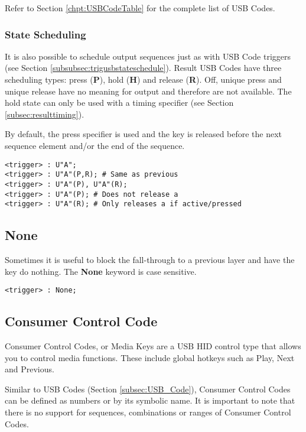 \documentclass{kiibohd-template}
\begin{document}
Refer to Section \ref{chpt:USBCodeTable} for the complete list of USB Codes.


\subsubsection{State Scheduling}
\label{subsubsec:resultusbcodestateschedule}

It is also possible to schedule output sequences just as with USB Code triggers (see Section \ref{subsubsec:trigusbstateschedule}).
Result USB Codes have three scheduling types: press (\textbf{P}), hold (\textbf{H}) and release (\textbf{R}).
Off, unique press and unique release have no meaning for output and therefore are not available.
The hold state can only be used with a timing specifier (see Section \ref{subsec:resulttiming}).

By default, the press specifier is used and the key is released before the next sequence element and/or the end of the sequence.

\begin{lstlisting}
<trigger> : U"A";
<trigger> : U"A"(P,R); # Same as previous
<trigger> : U"A"(P), U"A"(R);
<trigger> : U"A"(P); # Does not release a
<trigger> : U"A"(R); # Only releases a if active/pressed
\end{lstlisting}


\subsection{None}

Sometimes it is useful to block the fall-through to a previous layer and have the key do nothing.
The \textbf{None} keyword is case sensitive.

\begin{lstlisting}
<trigger> : None;
\end{lstlisting}


\subsection{Consumer Control Code}

Consumer Control Codes, or Media Keys are a USB HID control type that allows you to control media functions.
These include global hotkeys such as Play, Next and Previous.

Similar to USB Codes (Section \ref{subsec:USB_Code}), Consumer Control Codes can be defined as numbers or by its symbolic name.
It is important to note that there is no support for sequences, combinations or ranges of Consumer Control Codes.
\end{document}
